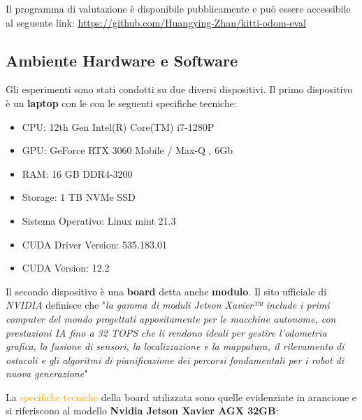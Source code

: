 \documentclass[12pt,a4paper]{report}
\begin{document}
Il programma di valutazione è disponibile pubblicamente e può essere accessibile al seguente link:
\url{https://github.com/Huangying-Zhan/kitti-odom-eval}

\subsection{Ambiente Hardware e Software}

Gli esperimenti sono stati condotti su due diversi dispositivi.
Il primo dispositivo è un \textbf{laptop} con le con le seguenti specifiche tecniche:

\begin{itemize}
    \item CPU: 12th Gen Intel(R) Core(TM) i7-1280P
    \item GPU: GeForce RTX 3060 Mobile / Max-Q , 6Gb
    \item RAM: 16 GB DDR4-3200
    \item Storage: 1 TB NVMe SSD
    \item Sistema Operativo: Linux mint 21.3
    \item CUDA Driver Version: 535.183.01  
    \item CUDA Version: 12.2
\end{itemize}

\vspace{1cm}

Il secondo dispositivo è una \textbf{board} detta anche \textbf{modulo}.
Il sito ufficiale di \textit{NVIDIA} definisce che "\textit{la gamma di moduli Jetson Xavier™ include i primi computer del mondo progettati appositamente per le macchine autonome, con prestazioni IA fino a 32 TOPS che li rendono ideali per gestire l'odometria grafica, la fusione di sensori, la localizzazione e la mappatura, il rilevamento di ostacoli e gli algoritmi di pianificazione dei percorsi fondamentali per i robot di nuova generazione}" \cite{board-series}

La \textcolor{orange}{specifiche tecniche} della board utilizzata sono quelle evidenziate in arancione e si riferiscono al modello \textbf{Nvidia Jetson Xavier AGX 32GB}:
\end{document}
